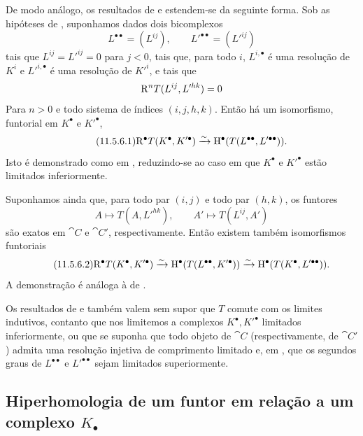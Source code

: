 \begin{env}[11.5.6]
\label{0.11.5.6}
De modo análogo, os resultados de  e  estendem-se da seguinte forma.
Sob as hipóteses de , suponhamos dados dois bicomplexos
\[
  L^{\bullet\bullet}=(L^{ij}),\qquad
  L'^{\bullet\bullet}=(L'^{ij})
\]
tais que $L^{ij}=L'^{ij}=0$ para $j<0$, tais que, para todo $i$, $L^{i,\bullet}$ é uma resolução de $K^i$ e $L'^{i,\bullet}$ é uma resolução de $K'^i$, e tais que
\[
  \mathrm{R}^nT(L^{ij},L'^{hk})=0
\]
Para $n>0$ e todo sistema de índices $(i,j,h,k)$.
Então há um isomorfismo, funtorial em $K^\bullet$ e $K'^\bullet$,
\[
\label{0.11.5.6.1}
\tag{11.5.6.1}
  \RR^\bullet T(K^\bullet,K'^\bullet)
  \simto
  \HH^\bullet(T(L^{\bullet\bullet},L'^{\bullet\bullet})).
\]
Isto é demonstrado como em , reduzindo-se ao caso em que $K^\bullet$ e $K'^\bullet$ estão limitados inferiormente.

Suponhamos ainda que, para todo par $(i,j)$ e todo par $(h,k)$, os funtores
\[
  A\longmapsto T(A,L'^{hk}),
  \qquad
  A'\longmapsto T(L^{ij},A')
\]
são exatos em $\cat{C}$ e $\cat{C}'$, respectivamente.
Então existem também isomorfismos funtoriais
\[
\label{0.11.5.6.2}
\tag{11.5.6.2}
  \RR^\bullet T(K^\bullet,K'^\bullet)
  \simto
  \HH^\bullet(T(L^{\bullet\bullet},K'^\bullet))
  \simto
  \HH^\bullet(T(K^\bullet,L'^{\bullet\bullet})).
\]
A demonstração é análoga à de .
\end{env}

\begin{env}[11.5.7]
\label{0.11.5.7}
Os resultados de  e  também valem sem supor que $T$ comute com os limites indutivos, contanto que nos limitemos a complexos $K^\bullet,K'^\bullet$ limitados inferiormente, ou que se suponha que todo objeto de $\cat{C}$ (respectivamente, de $\cat{C}'$) admita uma resolução injetiva de comprimento limitado e, em , que os segundos graus de $L^{\bullet\bullet}$ e $L'^{\bullet\bullet}$ sejam limitados superiormente.
\end{env}

\subsection{Hiperhomologia de um funtor em relação a um complexo $K_{\bullet}$}
\label{subsection:0.11.6}

